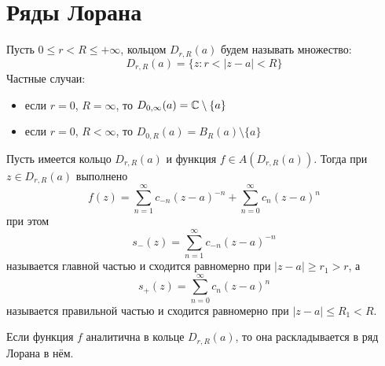 \documentclass[main]{subfiles}
\begin{document}
\chapter{Ряды Лорана}

\begin{definition}
    Пусть $0 \le r < R \le + \infty$, кольцом $D_{r, R}(a)$ будем называть множество:
    \[D_{r, R}(a) = \{z: r < |z - a| < R\}\]
    Частные случаи:
    \begin{itemize}
        \item если $r = 0$, $R = \infty$, то $D_{0, \infty}(a) = \mathbb{C} \setminus \{a\}$
        \item если $r = 0$, $R < \infty$, то $D_{0, R}(a) = B_R(a) \setminus \{a\}$
    \end{itemize}
\end{definition}
\begin{definition}
    Пусть имеется кольцо $D_{r, R}(a)$ и функция $f \in A(D_{r, R}(a))$.
    Тогда при $z \in D_{r, R}(a)$ выполнено
    \[f(z) = \sum_{n=1}^{\infty} c_{-n} (z-a)^{-n} + \sum_{n=0}^{\infty} c_{n} (z-a)^n \]
    при этом
    \[s_{-}(z) = \sum_{n=1}^{\infty} c_{-n} (z-a)^{-n}\]
    называется главной частью и сходится равномерно при $|z-a| \ge r_1 > r$, а
    \[s_{+}(z) = \sum_{n=0}^{\infty} c_{n} (z-a)^n\]
    называется правильной частью и сходится равномерно при $|z-a| \le R_1 < R$.
\end{definition}

\begin{theorem}
    Если функция $f$ аналитична в кольце $D_{r, R}(a)$, то она раскладывается в ряд Лорана в нём.
\end{theorem}
\end{document}
